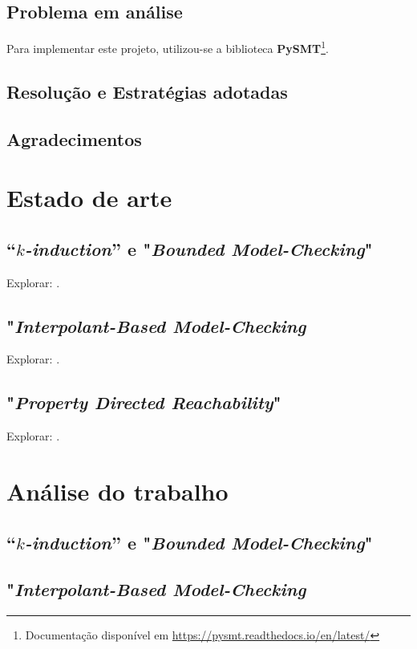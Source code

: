 \documentclass[11pt,a4paper]{report}%
\def\pdr{"\textit{Property Directed Reachability}"\xspace}
\def\bmc{"\textit{Bounded Model-Checking}"\xspace}
\def\imc{"\textit{Interpolant-Based Model-Checking}\xspace}
\def\pysmt{\textbf{PySMT}}
\def\pysmtlink{\footnote{Documentação disponível em \url{https://pysmt.readthedocs.io/en/latest/}}}
\def\kind{``\textit{$k$-induction}''\xspace}
\begin{document}
\section{Problema em análise}

Para implementar este projeto, utilizou-se a biblioteca \pysmt \pysmtlink.

\section{Resolução e Estratégias adotadas}

\section{Agradecimentos}

\chapter{Estado de arte} \label{chap:state_of_the_art} %

\section*{\kind e \bmc}

Explorar: \cite{bmc} \cite{kind}.

\section*{\imc}

Explorar: \cite{interpolation1} \cite{interpolation2} \cite{ctigar}.

\section*{\pdr}

Explorar: \cite{pdrverification} \cite{pdr1} \cite{pdr2}.

\chapter{Análise do trabalho} \label{chap:analysis}

\newpage
\section{\kind e \bmc}

\newpage
\section{\imc}
\end{document}
